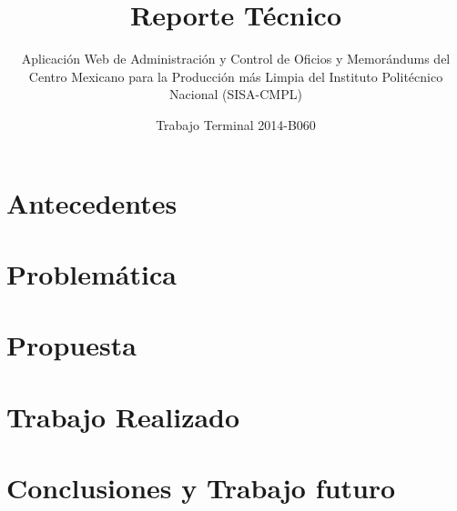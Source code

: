 \documentclass[oneside,10pt]{book}
\title{Reporte Técnico}
\subtitle{Aplicación Web de Administración y Control de Oficios y Memorándums del Centro Mexicano para la Producción más Limpia del Instituto Politécnico Nacional (SISA-CMPL)}
\author{Trabajo Terminal 2014-B060}
\begin{document}
\maketitle
\thispagestyle{empty}

\frontmatter
\tableofcontents

\mainmatter


\chapter{Antecedentes}
	

\chapter{Problemática}


\chapter{Propuesta}


\chapter{Trabajo Realizado}


\chapter{Conclusiones y Trabajo futuro}





\end{document}
